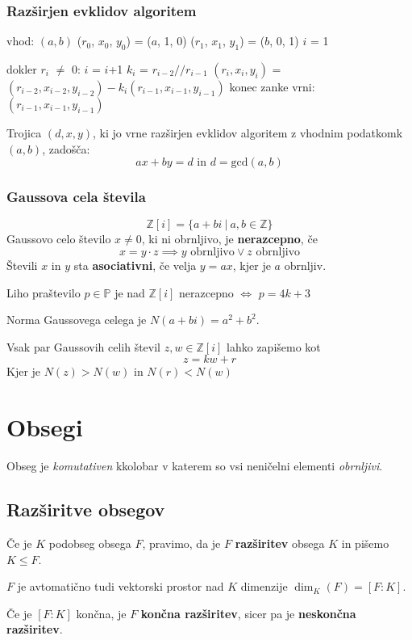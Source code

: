 \subsubsection*{Razširjen evklidov algoritem}
\begin{algorithm}
vhod: $(a, b)$
($r_0$, $x_0$, $y_0$) = ($a$, 1, 0)
($r_1$, $x_1$, $y_1$) = ($b$, 0, 1)
$i$ = 1

dokler $r_i$ $\neq$ 0:
$i$ = $i$+1
$k_i$ = $r_{i-2} // r_{i-1}$
$(r_i, x_i, y_i)$ = $(r_{i-2}, x_{i-2}, y_{i-2}) - k_i(r_{i-1}, x_{i-1}, y_{i-1})$
konec zanke
vrni: $(r_{i-1}, x_{i-1}, y_{i-1})$
\end{algorithm}

Trojica $(d, x, y)$, ki jo vrne razširjen evklidov algoritem z vhodnim podatkomk $(a, b)$, zadošča:
\[ax + by = d \text{ in } d = \textrm{gcd}(a, b)\] 

\subsubsection*{Gaussova cela števila}
\[ \mathbb{Z}[i] = \{a+bi\ |\ a,b \in \mathbb{Z} \}\]
Gaussovo celo število $x \neq 0$, ki ni obrnljivo, je \textbf{nerazcepno}, če
\[ x= y\cdot z \implies y \text{ obrnljivo} \vee z \text{ obrnljivo}\]
Števili $x$ in $y$ sta \textbf{asociativni}, če velja $y = ax$, kjer je $a$ obrnljiv.

Liho praštevilo $p \in \mathbb{P}$ je nad $\mathbb{Z}[i]$ nerazcepno $\iff$ $p = 4k+3$

Norma Gaussovega celega je $N(a+bi) = a^2 + b^2$.

Vsak par Gaussovih celih števil $z, w \in \mathbb{Z}[i]$  lahko zapišemo kot
\[z = kw + r \]
Kjer je $N(z) > N(w)$ in $N(r) < N(w)$

\section*{Obsegi}
Obseg je \emph{komutativen} kkolobar v katerem so vsi neničelni elementi \emph{obrnljivi}.

\subsection*{Razširitve obsegov}
Če je $K$ podobseg obsega $F$, pravimo, da je $F$ \textbf{razširitev} obsega $K$ in pišemo $K \leq F$.

$F$ je avtomatično tudi vektorski prostor nad $K$ dimenzije $\dim_K(F) = [F:K]$.

Če je $[F:K]$ končna, je $F$ \textbf{končna razširitev}, sicer pa je \textbf{neskončna razširitev}.

